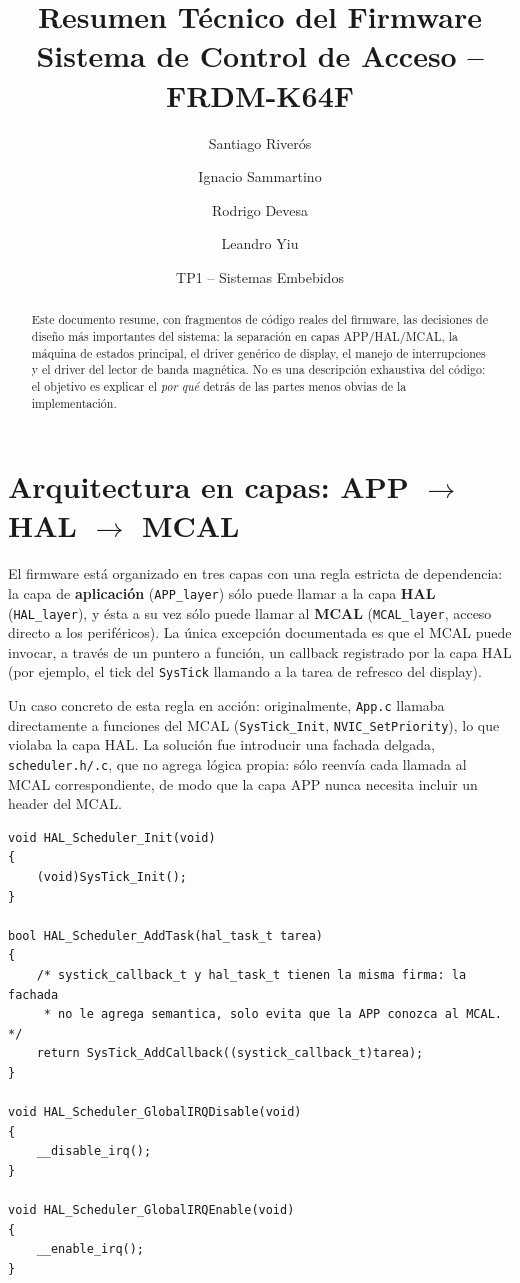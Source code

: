 \documentclass[11pt,a4paper]{article}
\title{\textbf{Resumen Técnico del Firmware}\\[4pt]
\large Sistema de Control de Acceso -- FRDM-K64F}
\author{Santiago Riverós \and Ignacio Sammartino \and Rodrigo Devesa \and Leandro Yiu}
\date{TP1 -- Sistemas Embebidos}
\begin{document}
\maketitle

\begin{abstract}
\noindent
Este documento resume, con fragmentos de código reales del firmware, las
decisiones de diseño más importantes del sistema: la separación en capas
APP/HAL/MCAL, la máquina de estados principal, el driver genérico de
display, el manejo de interrupciones y el driver del lector de banda
magnética. No es una descripción exhaustiva del código: el objetivo es
explicar el \emph{por qué} detrás de las partes menos obvias de la
implementación.
\end{abstract}

\tableofcontents

\section{Arquitectura en capas: APP $\to$ HAL $\to$ MCAL}

El firmware está organizado en tres capas con una regla estricta de
dependencia: la capa de \textbf{aplicación} (\lstinline{APP_layer}) sólo
puede llamar a la capa \textbf{HAL} (\lstinline{HAL_layer}), y ésta a su vez
sólo puede llamar al \textbf{MCAL} (\lstinline{MCAL_layer}, acceso directo a
los periféricos). La única excepción documentada es que el MCAL puede
invocar, a través de un puntero a función, un callback registrado por la
capa HAL (por ejemplo, el tick del \lstinline{SysTick} llamando a la tarea
de refresco del display).

Un caso concreto de esta regla en acción: originalmente, \lstinline{App.c}
llamaba directamente a funciones del MCAL (\lstinline{SysTick_Init},
\lstinline{NVIC_SetPriority}), lo que violaba la capa HAL. La solución fue
introducir una fachada delgada, \lstinline{scheduler.h/.c}, que no agrega
lógica propia: sólo reenvía cada llamada al MCAL correspondiente, de modo
que la capa APP nunca necesita incluir un header del MCAL.

\begin{lstlisting}[caption={Fachada HAL sobre el SysTick (\texttt{scheduler.c}): reenvío puro, sin lógica propia.}, label={lst:scheduler}]
void HAL_Scheduler_Init(void)
{
    (void)SysTick_Init();
}

bool HAL_Scheduler_AddTask(hal_task_t tarea)
{
    /* systick_callback_t y hal_task_t tienen la misma firma: la fachada
     * no le agrega semantica, solo evita que la APP conozca al MCAL. */
    return SysTick_AddCallback((systick_callback_t)tarea);
}

void HAL_Scheduler_GlobalIRQDisable(void)
{
    __disable_irq();
}

void HAL_Scheduler_GlobalIRQEnable(void)
{
    __enable_irq();
}
\end{lstlisting}
\end{document}
